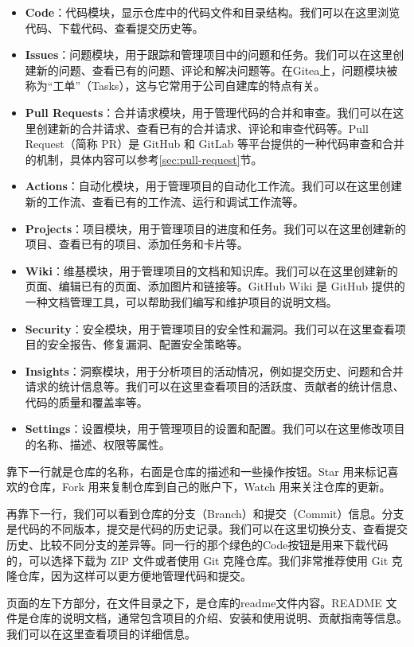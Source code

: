 \documentclass[../main.tex]{subfiles}
\begin{document}
\begin{itemize}
  \item \textbf{Code}：代码模块，显示仓库中的代码文件和目录结构。我们可以在这里浏览代码、下载代码、查看提交历史等。
  \item \textbf{Issues}：问题模块，用于跟踪和管理项目中的问题和任务。我们可以在这里创建新的问题、查看已有的问题、评论和解决问题等。在Gitea上，问题模块被称为“工单”（Tasks），这与它常用于公司自建库的特点有关。
  \item \textbf{Pull Requests}：合并请求模块，用于管理代码的合并和审查。我们可以在这里创建新的合并请求、查看已有的合并请求、评论和审查代码等。Pull Request（简称 PR）是 GitHub 和 GitLab 等平台提供的一种代码审查和合并的机制，具体内容可以参考\ref{sec:pull-request}节。
  \item \textbf{Actions}：自动化模块，用于管理项目的自动化工作流。我们可以在这里创建新的工作流、查看已有的工作流、运行和调试工作流等。
  \item \textbf{Projects}：项目模块，用于管理项目的进度和任务。我们可以在这里创建新的项目、查看已有的项目、添加任务和卡片等。
  \item \textbf{Wiki}：维基模块，用于管理项目的文档和知识库。我们可以在这里创建新的页面、编辑已有的页面、添加图片和链接等。GitHub Wiki 是 GitHub 提供的一种文档管理工具，可以帮助我们编写和维护项目的说明文档。
  \item \textbf{Security}：安全模块，用于管理项目的安全性和漏洞。我们可以在这里查看项目的安全报告、修复漏洞、配置安全策略等。
  \item \textbf{Insights}：洞察模块，用于分析项目的活动情况，例如提交历史、问题和合并请求的统计信息等。我们可以在这里查看项目的活跃度、贡献者的统计信息、代码的质量和覆盖率等。
  \item \textbf{Settings}：设置模块，用于管理项目的设置和配置。我们可以在这里修改项目的名称、描述、权限等属性。
\end{itemize}

靠下一行就是仓库的名称，右面是仓库的描述和一些操作按钮。Star 用来标记喜欢的仓库，Fork 用来复制仓库到自己的账户下，Watch 用来关注仓库的更新。

再靠下一行，我们可以看到仓库的分支（Branch）和提交（Commit）信息。分支是代码的不同版本，提交是代码的历史记录。我们可以在这里切换分支、查看提交历史、比较不同分支的差异等。同一行的那个绿色的Code按钮是用来下载代码的，可以选择下载为 ZIP 文件或者使用 Git 克隆仓库。我们非常推荐使用 Git 克隆仓库，因为这样可以更方便地管理代码和提交。

页面的左下方部分，在文件目录之下，是仓库的readme文件内容。README 文件是仓库的说明文档，通常包含项目的介绍、安装和使用说明、贡献指南等信息。我们可以在这里查看项目的详细信息。
\end{document}
